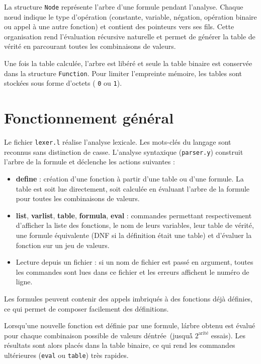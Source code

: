 \documentclass[11pt,a4paper]{article}
\begin{document}
La structure \texttt{Node} repr\'{e}sente l'arbre d'une formule pendant l'analyse. Chaque n\oe ud indique le type d'op\'{e}ration (constante, variable, n\'{e}gation, op\'{e}ration binaire ou appel \`a une autre fonction) et contient des pointeurs vers ses fils. Cette organisation rend l'\'evaluation r\'ecursive naturelle et permet de g\'{e}n\'{e}rer la table de v\'{e}rit\'{e} en parcourant toutes les combinaisons de valeurs.

Une fois la table calcul\'{e}e, l'arbre est lib\'{e}r\'{e} et seule la table binaire est conserv\'{e}e dans la structure \texttt{Function}. Pour limiter l'empreinte m\'{e}moire, les tables sont stock\'{e}es sous forme d'octets (
\texttt{0} ou \texttt{1}).
\section*{Fonctionnement général}
Le fichier \texttt{lexer.l} réalise l'analyse lexicale. Les mots-clés du langage sont reconnus sans distinction de casse. L'analyse syntaxique (\texttt{parser.y}) construit l'arbre de la formule et déclenche les actions suivantes :
\begin{itemize}
  \item \textbf{define} : création d'une fonction à partir d'une table ou d'une formule. La table est soit lue directement, soit calculée en évaluant l'arbre de la formule pour toutes les combinaisons de valeurs.
  \item \textbf{list}, \textbf{varlist}, \textbf{table}, \textbf{formula}, \textbf{eval} : commandes permettant respectivement d'afficher la liste des fonctions, le nom de leurs variables, leur table de vérité, une formule équivalente (DNF si la définition était une table) et d'évaluer la fonction sur un jeu de valeurs.
  \item Lecture depuis un fichier : si un nom de fichier est passé en argument, toutes les commandes sont lues dans ce fichier et les erreurs affichent le numéro de ligne.
\end{itemize}
Les formules peuvent contenir des appels imbriqués à des fonctions déjà définies, ce qui permet de composer facilement des définitions.

Lorsqu'une nouvelle fonction est d\'efinie par une formule, l\'arbre obtenu est \'evalu\'e pour chaque combinaison possible de valeurs d\'entr\'ee \,(jusqu\'\`a $2^{\text{arité}}$ essais). Les r\'esultats sont alors plac\'es dans la table binaire, ce qui rend les commandes ult\'erieures (\texttt{eval} ou \texttt{table}) tr\`es rapides.
\end{document}
